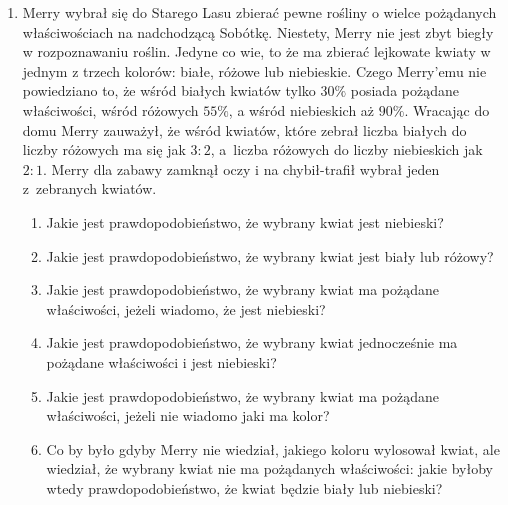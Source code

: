 \documentclass[twoside]{mwart}
\newcommand{\ans}[1]{}
\newcommand{\ans}[1]{\par\emph{Odpowiedź:} #1}
\begin{document}
\begin{enumerate}
\ans{
	Oznaczamy zdarzenia:
	\begin{itemize}
		\item $K$ element sklasyfikowany jako dobry
		\item $K'$ element sklasyfikowany jako zły
		\item $D$ element faktycznie dobry
		\item $D'$ element faktycznie zły
	\end{itemize}
	Odczytujemy prawdopodobieństwa z treści zadania i obliczamy prawdopodobieństwa zdarzeń przeciwnych:
	\begin{gather*}
		P(D)=0{,}9 \qquad P(D')=0{,}1 \\
		P(K|D')=0{,}05 \qquad P(K'|D')=0{,}95 \\
		P(K'|D)=0{,}02 \qquad P(K|D)=0{,}98
	\end{gather*}
	Mamy policzyć $P(D|K)$, a skoro znamy prawdopodobieństwa "w drugą stronę" (tj. np. $P(K|D)$), to korzystamy z tw. Bayesa:
	\begin{gather*}
		P(D|K)=  \frac{P(K|D)P(D)}{P(K)} = \frac{P(K|D)P(D)}{P(K|D)P(D)+P(K|D')P(D')} = 
		\frac{0{,}98\cdot 0{,}9}{0{,}98\cdot 0{,}9 + 0{,}05\cdot 0{,}1}=\frac{882}{887}
	\end{gather*}
} 

\item Merry wybrał się do Starego Lasu zbierać pewne rośliny o wielce pożądanych właściwościach na nadchodzącą Sobótkę.
Niestety, Merry nie jest zbyt biegły w rozpoznawaniu roślin.
Jedyne co wie, to że ma zbierać lejkowate kwiaty w jednym z trzech kolorów: białe, różowe lub niebieskie.
Czego Merry'emu nie powiedziano to, że wśród białych kwiatów tylko $30\%$ posiada pożądane właściwości, wśród różowych $55\%$, a wśród niebieskich
aż $90\%$.
Wracając do domu Merry zauważył, że wśród kwiatów, które zebrał liczba białych do liczby różowych ma się jak $3:2$, a~liczba różowych do
liczby niebieskich jak $2:1$. Merry dla zabawy zamknął oczy i na chybił-trafił wybrał jeden z~zebranych kwiatów.
 
\begin{enumerate}
	\item Jakie jest prawdopodobieństwo, że wybrany kwiat jest niebieski?
	\item Jakie jest prawdopodobieństwo, że wybrany kwiat jest biały lub różowy?
	\item Jakie jest prawdopodobieństwo, że wybrany kwiat ma pożądane właściwości, jeżeli wiadomo, że jest niebieski?
	\item Jakie jest prawdopodobieństwo, że wybrany kwiat jednocześnie ma pożądane właściwości i jest niebieski?
	\item Jakie jest prawdopodobieństwo, że wybrany kwiat ma pożądane właściwości, jeżeli nie wiadomo jaki ma kolor?
	\item Co by było gdyby Merry nie wiedział, jakiego koloru wylosował kwiat, ale wiedział, że wybrany kwiat nie ma pożądanych
		właściwości: jakie byłoby wtedy prawdopodobieństwo, że kwiat będzie biały lub niebieski?
\end{enumerate}


\end{enumerate}
\end{document}
